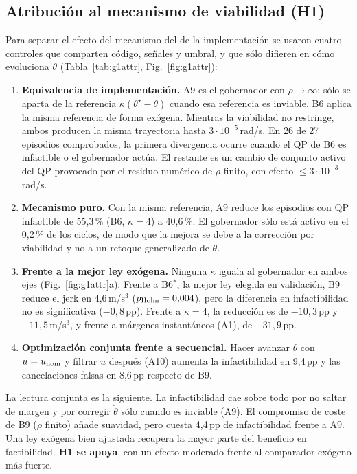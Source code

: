 \subsection{Atribución al mecanismo de viabilidad (H1)}
\label{sec:g1:attr}
Para separar el efecto del mecanismo del de la implementación se usaron cuatro controles que comparten
código, señales y umbral, y que sólo difieren en cómo evoluciona $\theta$
(Tabla~\ref{tab:g1attr}, Fig.~\ref{fig:g1attr}):
\begin{enumerate}[label=(\alph*)]
\item \textbf{Equivalencia de implementación.} A9 es el gobernador con $\rho\to\infty$: sólo se aparta de la
referencia $\kappa(\theta^\star-\theta)$ cuando esa referencia es inviable. B6 aplica la misma referencia de
forma exógena. Mientras la viabilidad no restringe, ambos producen la misma trayectoria hasta $3\cdot10^{-5}$\,rad/s.
En 26 de 27 episodios comprobados, la primera divergencia ocurre cuando el QP de B6 es infactible o el gobernador
actúa. El restante es un cambio de conjunto activo del QP provocado por el residuo numérico de $\rho$ finito, con
efecto $\le3\cdot10^{-3}$\,rad/s.
\item \textbf{Mecanismo puro.} Con la misma referencia, A9 reduce los episodios con QP infactible de 55{,}3\,\%
(B6, $\kappa=4$) a 40{,}6\,\%. El gobernador sólo está activo en el 0{,}2\,\% de los ciclos, de modo que la mejora
se debe a la corrección por viabilidad y no a un retoque generalizado de $\theta$.
\item \textbf{Frente a la mejor ley exógena.} Ninguna $\kappa$ iguala al gobernador en ambos ejes
(Fig.~\ref{fig:g1attr}a). Frente a B6$^\ast$, la mejor ley elegida en validación, B9 reduce el jerk en 4{,}6\,m/s$^3$
($p_{\rm Holm}=0{,}004$), pero la diferencia en infactibilidad no es significativa ($-0{,}8$\,pp). Frente a
$\kappa=4$, la reducción es de $-10{,}3$\,pp y $-11{,}5$\,m/s$^3$, y frente a márgenes instantáneos (A1), de $-31{,}9$\,pp.
\item \textbf{Optimización conjunta frente a secuencial.} Hacer avanzar $\theta$ con $u=u_{\rm nom}$ y filtrar $u$
después (A10) aumenta la infactibilidad en 9{,}4\,pp y las cancelaciones falsas en 8{,}6\,pp respecto de B9.
\end{enumerate}
La lectura conjunta es la siguiente. La infactibilidad cae sobre todo por no saltar de margen y por corregir
$\dot\theta$ sólo cuando es inviable (A9). El compromiso de coste de B9 ($\rho$ finito) añade suavidad, pero cuesta
4{,}4\,pp de infactibilidad frente a A9. Una ley exógena bien ajustada recupera la mayor parte del beneficio en
factibilidad. \textbf{H1 se apoya}, con un efecto moderado frente al comparador exógeno más fuerte.

